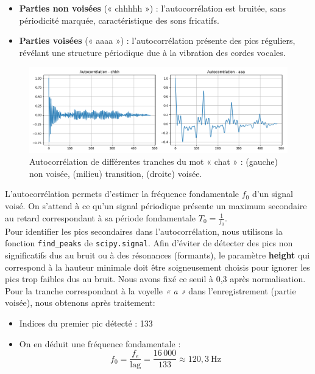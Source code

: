 \begin{itemize}
    \item \textbf{Parties non voisées} (« chhhhh ») : l'autocorrélation est bruitée, sans périodicité marquée, caractéristique des sons fricatifs.
    \item \textbf{Parties voisées} (« aaaa ») : l'autocorrélation présente des pics réguliers, révélant une structure périodique due à la vibration des cordes vocales.
\end{itemize}

\begin{figure}[h!]
    \centering
    \includegraphics[width=17cm]{screenshots/autocorrelation_chat_2.png}
    \caption{Autocorrélation de différentes tranches du mot « chat » : (gauche) non voisée, (milieu) transition, (droite) voisée.}
\end{figure}


L’autocorrélation permets d'estimer la fréquence fondamentale \(f_0\) d’un signal voisé. On s’attend à ce qu’un signal périodique présente un maximum secondaire au retard correspondant à sa période fondamentale \(T_0 = \frac{1}{f_0}\).\\

Pour identifier les pics secondaires dans l’autocorrélation, nous utilisons la fonction \verb|find_peaks| de \texttt{scipy.signal}.
Afin d’éviter de détecter des pics non significatifs dus au bruit ou à des résonances (formants), le paramètre \textbf{height} qui correspond à la hauteur minimale doit être soigneusement choisis pour ignorer les pics trop faibles dus au bruit. Nous avons fixé ce seuil à 0{,}3 après normalisation.\\

Pour la tranche correspondant à la voyelle \textit{« a »} dans l’enregistrement (partie voisée), nous obtenons après traitement:

\begin{itemize}
    \item Indices du premier pic détecté : 133
    \item On en déduit une fréquence fondamentale :
    \[
    f_0 = \frac{f_e}{\text{lag}} = \frac{16\,000}{133} \approx 120{,}3\ \mathrm{Hz}
    \]
\end{itemize}

